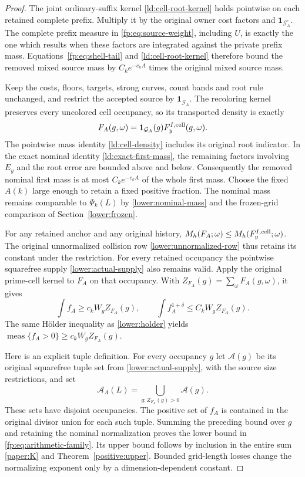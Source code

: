 \begin{proof}
The joint ordinary-suffix kernel \eqref{ld:cell-root-kernel}
holds pointwise on each retained complete prefix. Multiply it by
the original owner cost factors and
$\mathbf1_{\mathcal G_A^c}$. The complete prefix measure in
\eqref{fp:eq:source-weight}, including $U$, is exactly the one
which results when these factors are integrated against the private
prefix mass. Equations~\eqref{fp:eq:shell-tail} and
\eqref{ld:cell-root-kernel} therefore bound the removed mixed
source mass by $C_ke^{-c_kA}$ times the original mixed source mass.

Keep the costs, floors, targets, strong curves, count bands and root
rule unchanged, and restrict the accepted source by
$\mathbf1_{\mathcal G_A}$. The recoloring kernel preserves every
uncolored cell occupancy, so its transported density is exactly
\begin{equation}
 F_A(g,\omega)=\mathbf1_{\mathcal G_A}(g)F_y^{I,\rm cell}(g,\omega).
 \label{fp:eq:restricted-density}
\end{equation}
The pointwise mass identity \eqref{ld:cell-density} includes its
original root indicator. In the exact nominal identity
\eqref{ld:exact-first-mass}, the remaining factors involving
$E_y$ and the root error are bounded above and below. Consequently
the removed nominal first mass is at most $C_ke^{-c_kA}$ of the
whole first mass. Choose the fixed $A(k)$ large enough to retain
a fixed positive fraction. The nominal mass remains comparable to
$\Psi_k(L)$ by \eqref{lower:nominal-mass} and the frozen-grid
comparison of Section~\ref{lower:frozen}.

For any retained anchor and any original history,
$M_h(F_A;\omega)\le M_h(F_y^{I,\rm cell};\omega)$. The original
unnormalized collision row \eqref{lower:unnormalized-row} thus
retains its constant under the restriction. For every retained
occupancy the pointwise squarefree supply
\eqref{lower:actual-supply} also remains valid. Apply the original
prime-cell kernel to $F_A$ on that occupancy. With
$Z_{F_A}(g)=\sum_\omega F_A(g,\omega)$, it gives
\[
 \int f_A\ge c_kW_gZ_{F_A}(g),\qquad
 \int f_A^{1+\delta}\le C_kW_gZ_{F_A}(g).
\]
The same H\"older inequality as \eqref{lower:holder} yields
$\operatorname{meas}\{f_A>0\}\ge c_kW_gZ_{F_A}(g)$.

Here is an explicit tuple definition. For every occupancy $g$ let
$\mathcal A(g)$ be its original squarefree tuple set from
\eqref{lower:actual-supply}, with the source size restrictions, and set
\begin{equation}
 \mathcal A_A(L)=
    \bigcup_{g:Z_{F_A}(g)>0}\mathcal A(g).
 \label{fp:eq:tuple-family-definition}
\end{equation}
These sets have disjoint occupancies. The positive set of $f_A$ is
contained in the original divisor union for each such tuple.
Summing the preceding bound over $g$ and retaining the nominal
normalization proves the lower bound in
\eqref{fp:eq:arithmetic-family}. Its upper bound follows by
inclusion in the entire sum \eqref{paper:K} and
Theorem~\ref{positive:upper}. Bounded grid-length losses change the
normalizing exponent only by a dimension-dependent constant.


\end{proof}
